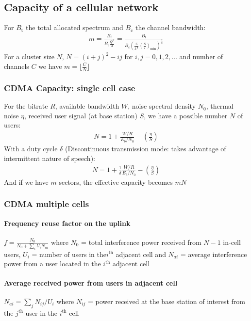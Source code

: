 \documentclass[10pt, a4paper,twocolumn]{scrartcl}
\begin{document}
\subsection{Capacity of a cellular network}
For $B_\textrm{t}$ the total allocated spectrum and $B_\textrm{c}$ the channel bandwidth: 
\begin{align*}
m = \frac{B_t}{B_c \frac{Q^2}{3}} = \frac{B_t}{B_c\left(\frac{6}{3^{\frac{\alpha}{2}}}\left(\frac{S}{I}\right)_\textrm{min}\right)^{\frac{2}{\alpha}}}
\end{align*}
For a cluster size $N$, $N = (i + j)^2 - ij$ for $i,j=0,1,2,\ldots$ and number of channels $C$ we have $m=\lfloor\frac CN\rfloor$

\subsubsection{CDMA Capacity: single cell case}
For the bitrate $R$, available bandwidth $W$, noise spectral density $N_0$, thermal noise $\eta$, received user signal (at base station) $S$, we have a possible number $N$ of users:
\begin{align*}
	N = 1 + \frac{W/R}{E_b/N_0} - (\frac{\eta}{S})
\end{align*}
With a duty cycle $\delta$ (Discontinuous transmission mode: takes advantage of
intermittent nature of speech):
\begin{align*}
	N = 1 + \frac1\delta\frac{W/R}{E_b/N_0} - (\frac{\eta}{S})
\end{align*}
And if we have $m$ sectors, the effective capacity becomes $mN$
\subsubsection{CDMA multiple cells}
\paragraph{Frequency reuse factor on the uplink} 
$f = \frac{N_0}{N_0 + \sum_iU_iN_{ai}}$ where $N_0$ = total interference power received from $N-1$ in-cell users, $U_i$ = number of users in the$i^\text{th}$ adjacent cell and $N_{ai}$ = average interference power from a user located in the $i^\text{th}$ adjacent cell

\paragraph{Average received power from users in adjacent cell}
$N_{ai} = \sum_j N_{ij}/U_i$ where $N_{ij}$ = power received at the base station of interest from the $j^\text{th}$ user in the $i^\text{th}$ cell
\end{document}
